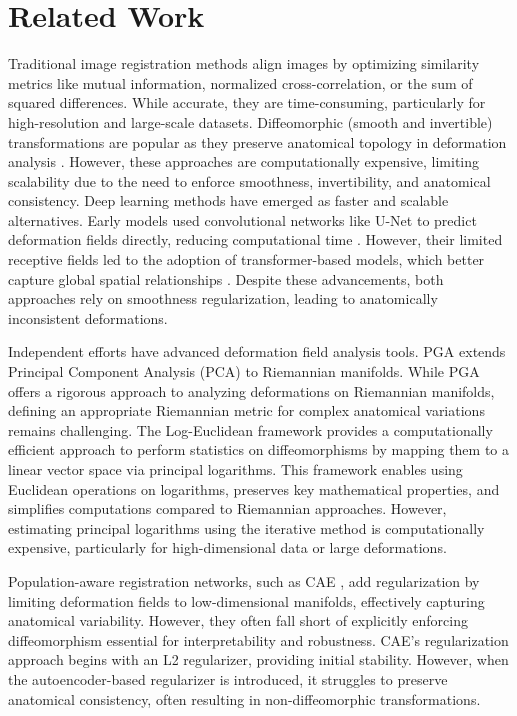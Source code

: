 \vspace{-4mm}
\section{Related Work}
Traditional image registration methods align images by optimizing similarity metrics like mutual information, normalized cross-correlation, or the sum of squared differences. While accurate, they are time-consuming, particularly for high-resolution and large-scale datasets. Diffeomorphic (smooth and invertible) transformations are popular as they preserve anatomical topology in deformation analysis \cite{fu2020deep}. However, these approaches are computationally expensive, limiting scalability due to the need to enforce smoothness, invertibility, and anatomical consistency. 
%
Deep learning methods have emerged as faster and scalable alternatives. Early models used convolutional networks like U-Net \cite{ronneberger2015u} to predict deformation fields directly, reducing computational time \cite{boveiri2020medical}. However, their limited receptive fields led to the adoption of transformer-based models, which better capture global spatial relationships \cite{chen2022transmorph}. Despite these advancements, both approaches rely on smoothness regularization, leading to anatomically inconsistent deformations.

Independent efforts have advanced deformation field analysis tools. PGA \cite{fletcher2004principal, fletcher2011geodesic} extends Principal Component Analysis (PCA) to Riemannian manifolds. While PGA offers a rigorous approach to analyzing deformations on Riemannian manifolds, defining an appropriate Riemannian metric for complex anatomical variations remains challenging.
The Log-Euclidean framework \cite{arsigny2006log} provides a computationally efficient approach to perform statistics on diffeomorphisms by mapping them to a linear vector space via principal logarithms. This framework enables using Euclidean operations on logarithms, preserves key mathematical properties, and simplifies computations compared to Riemannian approaches. However, estimating principal logarithms using the iterative method is computationally expensive, particularly for high-dimensional data or large deformations.

Population-aware registration networks, such as CAE \cite{bhalodia2019cooperative}, add regularization by limiting deformation fields to low-dimensional manifolds, effectively capturing anatomical variability. However, they often fall short of explicitly enforcing diffeomorphism essential for interpretability and robustness. CAE's regularization approach begins with an L2 regularizer, providing initial stability. However, when the autoencoder-based regularizer is introduced, it struggles to preserve anatomical consistency, often resulting in non-diffeomorphic transformations.

